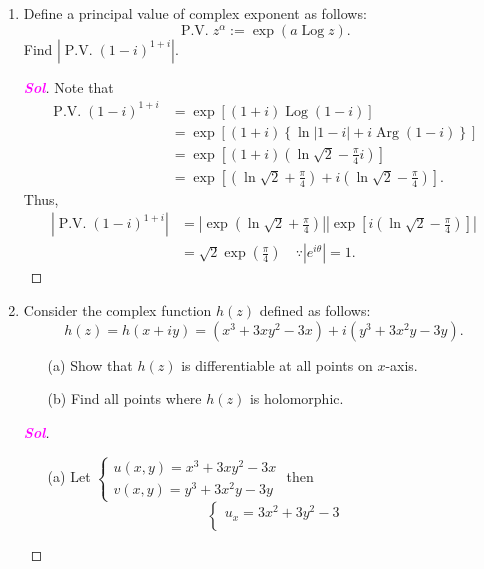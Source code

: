 \documentclass{article}
\theoremstyle{definition}
\newcommand{\set}[1]{\left\{#1\right\}}
\newcommand{\Log}{\operatorname{Log}}
\newcommand{\Arg}{\operatorname{Arg}}
\newcommand{\pv}{\operatorname{P.V.}}
\newcommand{\of}[1]{\left( #1 \right)}
\newcommand{\abs}[1]{\left\lvert #1 \right\rvert}
\newcommand{\sol}{\textcolor{magenta}{\bf Sol}}
\begin{document}
\begin{enumerate}
\begin{proof}[\sol]
\begin{align*}
			\int_Cf\of{z}dz=\int_0^{1+i}f\of{z}dz=F\of{1+i}-F\of{0}&=\of{1+i}^3-2i(1+i)^2-0\\
			&=1+3i+3i^2+i^3-2i(1+2i+i^2)\\
			&=-2+2i+(-2i+4+2i)\\
			&=2+2i.
			\end{align*}
		\end{proof}
		\newpage
		\item Define a principal value of complex exponent as follows: \[
		\pv z^\alpha:=\exp\of{a\Log z}.
		\] Find $\abs{\pv\of{1-i}^{1+i}}$.
		\begin{proof}[\sol]
			Note that \begin{align*}
			\pv (1-i)^{1+i}&=\exp\left[(1+i)\Log(1-i)\right]\\
			&=\exp\left[(1+i)\set{\ln\abs{1-i}+i\Arg\of{1-i}}\right]\\
			&=\exp\left[(1+i)\of{\ln\sqrt{2}-\frac{\pi}{4}i}\right]\\
			&=\exp\left[\of{\ln\sqrt{2}+\frac{\pi}{4}}+i\of{\ln\sqrt{2}-\frac{\pi}{4}}\right].
			\end{align*} Thus, \begin{align*}
			\abs{\pv(1-i)^{1+i}}&=\abs{\exp\of{\ln\sqrt{2}+\frac{\pi}{4}}}\abs{\exp\left[i\of{\ln\sqrt{2}-\frac{\pi}{4}}\right]}\\
			&=\sqrt{2}\exp\of{\frac{\pi}{4}}\quad\because \abs{e^{i\theta}}=1.
			\end{align*}
		\end{proof}
		\vspace{8pt}
		\item Consider the complex function $h\of{z}$ defined as follows: \[
		h\of{z}=h\of{x+iy}=\of{x^3+3xy^2-3x}+i\of{y^3+3x^2y-3y}.
		\]\begin{itemize}
			\item[(a)] Show that $h\of{z}$ is differentiable at all points on $x$-axis.
			\item[(b)] Find all points where $h\of{z}$ is holomorphic.
		\end{itemize}
		\begin{proof}[\sol]
			\begin{itemize}
				\item[(a)]
				Let $\begin{cases}
				u(x,y)=x^3+3xy^2-3x\\
				v(x,y)=y^3+3x^2y-3y
				\end{cases}$ then \[
				\begin{cases}
				u_x=3x^2+3y^2-3\\

\end{cases}\]
\end{itemize}
\end{proof}
\end{enumerate}
\end{document}
